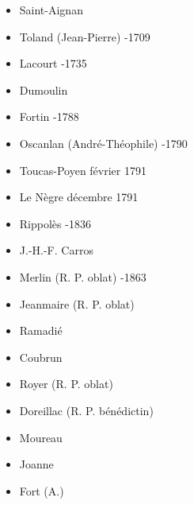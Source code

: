 \documentclass[a4paper,11pt]{book}
\begin{document}
        \begin{itemize}
        	\item[] Saint-Aignan 
			\item[] Toland (Jean-Pierre) -1709
			\item[] Lacourt -1735
			\item[] Dumoulin 
			\item[] Fortin -1788
			\item[] Oscanlan (André-Théophile) -1790
			\item[] Toucas-Poyen  février 1791
			\item[] Le Nègre  décembre 1791
			\item[] Rippolès -1836
			\item[] J.-H.-F. Carros 
			\item[] Merlin (R. P. oblat) -1863
			\item[] Jeanmaire (R. P. oblat) 
			\item[] Ramadié 
			\item[] Coubrun 
			\item[] Royer (R. P. oblat) 
			\item[] Doreillac (R. P. bénédictin) 
			\item[] Moureau 
			\item[] Joanne 
			\item[] Fort (A.)	
        \end{itemize} 
        
\end{document}
